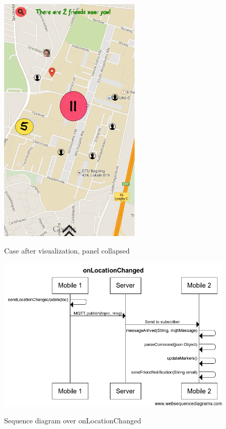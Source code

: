 \documentclass[runningheads,a4paper]{llncs}
\begin{document}
\begin{figure}
\centering
\caption{Case after visualization, panel collapsed}
\includegraphics[width=0.6\textwidth]{figures/lo-fi-6}
\label{fig:after-visualization}
\end{figure}

\begin{figure}
\centering
\caption{Sequence diagram over onLocationChanged}
\includegraphics[scale=0.5]{figures/sq-1}
\label{fig:sq-onLocation}
\end{figure}
\end{document}
